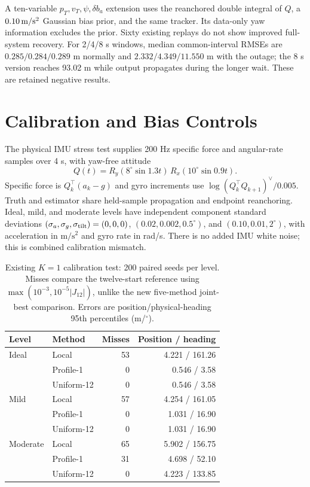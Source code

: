 \documentclass[conference,letterpaper,10pt]{IEEEtran}
\begin{document}
A ten-variable $p_T,v_T,\psi,\delta b_a$ extension uses the reanchored double integral of $Q$, a $0.10\,{\rm m/s^2}$ Gaussian bias prior, and the same tracker. Its data-only yaw information excludes the prior. Sixty existing replays do not show improved full-system recovery. For 2/4/8 s windows, median common-interval RMSEs are $0.285/0.284/0.289$ m normally and $2.332/4.349/11.550$ m with the outage; the 8 s version reaches 93.02 m while output propagates during the longer wait. These are retained negative results.


\section{Calibration and Bias Controls}
The physical IMU stress test supplies 200 Hz specific force and angular-rate samples over 4 s, with yaw-free attitude
\begin{equation}
 Q(t)=R_y(8^\circ\sin1.3t)\,R_x(10^\circ\sin0.9t).
\end{equation}
Specific force is $Q_k^\top(a_k-g)$ and gyro increments use $\log(Q_k^\top Q_{k+1})^\vee/0.005$. Truth and estimator share held-sample propagation and endpoint reanchoring. Ideal, mild, and moderate levels have independent component standard deviations $(\sigma_a,\sigma_g,\sigma_{\rm tilt})=(0,0,0)$, $(0.02,0.002,0.5^\circ)$, and $(0.10,0.01,2^\circ)$, with acceleration in $\mathrm{m/s^2}$ and gyro rate in rad/s. There is no added IMU white noise; this is combined calibration mismatch.

\begin{table}[t]
\caption{Existing $K=1$ calibration test: 200 paired seeds per level. Misses compare the twelve-start reference using $\max(10^{-3},10^{-5}|J_{12}|)$, unlike the new five-method joint-best comparison. Errors are position/physical-heading 95th percentiles (m/$^\circ$).}
\centering
\begin{tabular}{llrr}
\toprule
Level&Method&Misses&Position / heading\\
\midrule
Ideal&Local&53&4.221 / 161.26\\
&Profile-1&0&0.546 / 3.58\\
&Uniform-12&0&0.546 / 3.58\\
Mild&Local&57&4.254 / 161.05\\
&Profile-1&0&1.031 / 16.90\\
&Uniform-12&0&1.031 / 16.90\\
Moderate&Local&65&5.902 / 156.75\\
&Profile-1&31&4.698 / 52.10\\
&Uniform-12&0&4.223 / 133.85\\
\bottomrule
\end{tabular}
\end{table}
\end{document}
